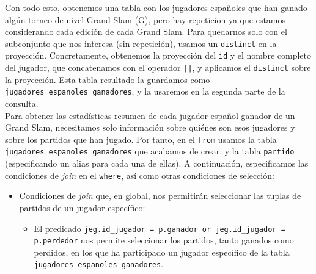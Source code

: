 \documentclass[11pt]{opticajnl}
\begin{document}
Con todo esto, obtenemos una tabla con los jugadores españoles que han ganado algún torneo de nivel Grand Slam (G), pero hay repeticion ya que estamos considerando cada edición de cada Grand Slam. Para quedarnos solo con el subconjunto que nos interesa (sin repetición), usamos un \texttt{distinct} en la proyección. Concretamente, obtenemos la proyección del \texttt{id} y el nombre completo del jugador, que concatenamos con el operador \texttt{||}, y aplicamos el \texttt{distinct} sobre la proyección. Esta tabla resultado la guardamos como \texttt{jugadores\_espanoles\_ganadores}, y la usaremos en la segunda parte de la consulta. \\

Para obtener las estadísticas resumen de cada jugador español ganador de un Grand Slam, necesitamos solo información sobre quiénes son esos jugadores y sobre los partidos que han jugado. Por tanto, en el \texttt{from} usamos la tabla \texttt{jugadores\_espanoles\_ganadores} que acabamos de crear, y la tabla \texttt{partido} (especificando un alias para cada una de ellas). A continuación, especificamos las condiciones de \textit{join} en el \texttt{where}, así como otras condiciones de selección:
\begin{itemize}
\item Condiciones de \textit{join} que, en global, nos permitirán seleccionar las tuplas de partidos de un jugador específico:
\begin{itemize}
\item El predicado \texttt{jeg.id\_jugador = p.ganador or jeg.id\_jugador = p.perdedor} nos permite seleccionar los partidos, tanto ganados como perdidos, en los que ha participado un jugador específico de la tabla \texttt{jugadores\_espanoles\_ganadores}.
\end{itemize}
\end{itemize}
\end{document}
